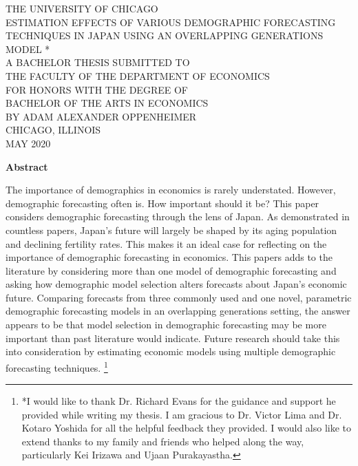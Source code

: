 \documentclass[10pt]{article}
\renewcommand{\thesection}{\arabic{section}}
\renewcommand{\section}[2][]{\oldsection[#1]{#2}\index{#1}\label{sec:\thesection}}
\numberwithin{equation}{subsection}
\newcommand\blfootnote[1]{%
  \begingroup
  \renewcommand\thefootnote{}\footnote{#1}%
  \addtocounter{footnote}{-1}%
  \endgroup
}
\begin{document}
\begin{titlepage}
\begin{center}

THE UNIVERSITY OF CHICAGO \\[1.5in]

ESTIMATION EFFECTS OF VARIOUS DEMOGRAPHIC FORECASTING TECHNIQUES IN JAPAN USING AN OVERLAPPING GENERATIONS MODEL * \\[1in]

A BACHELOR THESIS SUBMITTED TO \\
\bigskip
THE FACULTY OF THE DEPARTMENT OF ECONOMICS \\
\bigskip
FOR HONORS WITH THE DEGREE OF \\
\bigskip
BACHELOR OF THE ARTS IN ECONOMICS \\[1.5in]

BY ADAM ALEXANDER OPPENHEIMER \\[2in]
CHICAGO, ILLINOIS \\
MAY 2020
\end{center}
\end{titlepage}


\begin{center}
   \textbf{Abstract}
\end{center}
\par The importance of demographics in economics is rarely understated. However, demographic forecasting often is. How important should it be? This paper considers demographic forecasting through the lens of Japan. As demonstrated in countless papers, Japan's future will largely be shaped by its aging population and declining fertility rates. This makes it an ideal case for reflecting on the importance of demographic forecasting in economics. This papers adds to the literature by considering more than one model of demographic forecasting and asking how demographic model selection alters forecasts about Japan's economic future. Comparing forecasts from three commonly used and one novel, parametric demographic forecasting models in an overlapping generations setting, the answer appears to be that model selection in demographic forecasting may be more important than past literature would indicate. Future research should take this into consideration by estimating economic models using multiple demographic forecasting techniques.\blfootnote{*I would like to thank Dr. Richard Evans for the guidance and support he provided while writing my thesis. I am gracious to Dr. Victor Lima and Dr. Kotaro Yoshida for all the helpful feedback they provided. I would also like to extend thanks to my family and friends who helped along the way, particularly Kei Irizawa and Ujaan Purakayastha.}
\end{document}
